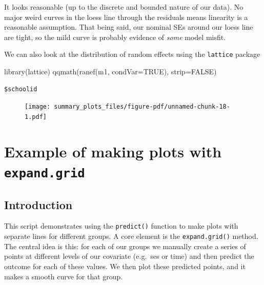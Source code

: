 \documentclass[
  letterpaper,
  DIV=11,
  numbers=noendperiod]{scrreprt}
\newenvironment{Shaded}{\begin{snugshade}}{\end{snugshade}}
\newcommand{\AttributeTok}[1]{\textcolor[rgb]{0.49,0.56,0.16}{#1}}
\newcommand{\ConstantTok}[1]{\textcolor[rgb]{0.53,0.00,0.00}{#1}}
\newcommand{\FunctionTok}[1]{\textcolor[rgb]{0.02,0.16,0.49}{#1}}
\newcommand{\NormalTok}[1]{\textcolor[rgb]{0.00,0.44,0.13}{#1}}
\begin{document}
It looks reasonable (up to the discrete and bounded nature of our data).
No major weird curves in the loess line through the residuals means
linearity is a reasonable assumption. That being said, our nominal SEs
around our loess line are tight, so the mild curve is probably evidence
of \emph{some} model misfit.

We can also look at the distribution of random effects using the
\texttt{lattice} package

\begin{Shaded}
\begin{Highlighting}[]
  \FunctionTok{library}\NormalTok{(lattice)}
  \FunctionTok{qqmath}\NormalTok{(}\FunctionTok{ranef}\NormalTok{(m1, }\AttributeTok{condVar=}\ConstantTok{TRUE}\NormalTok{), }\AttributeTok{strip=}\ConstantTok{FALSE}\NormalTok{)}
\end{Highlighting}
\end{Shaded}

\begin{verbatim}
$schoolid
\end{verbatim}

\begin{figure}[H]

{\centering \texttt{[image: summary\_plots\_files/figure-pdf/unnamed-chunk-18-1.pdf]}

}

\end{figure}

\hypertarget{example-of-making-plots-with-expand.grid}{%
\chapter{\texorpdfstring{Example of making plots with
\texttt{expand.grid}}{Example of making plots with expand.grid}}\label{example-of-making-plots-with-expand.grid}}

\hypertarget{introduction-2}{%
\section{Introduction}\label{introduction-2}}

This script demonstrates using the \texttt{predict()} function to make
plots with separate lines for different groups. A core element is the
\texttt{expand.grid()} method. The central idea is this: for each of our
groups we manually create a series of points at different levels of our
covariate (e.g.~ses or time) and then predict the outcome for each of
these values. We then plot these predicted points, and it makes a smooth
curve for that group.
\end{document}
